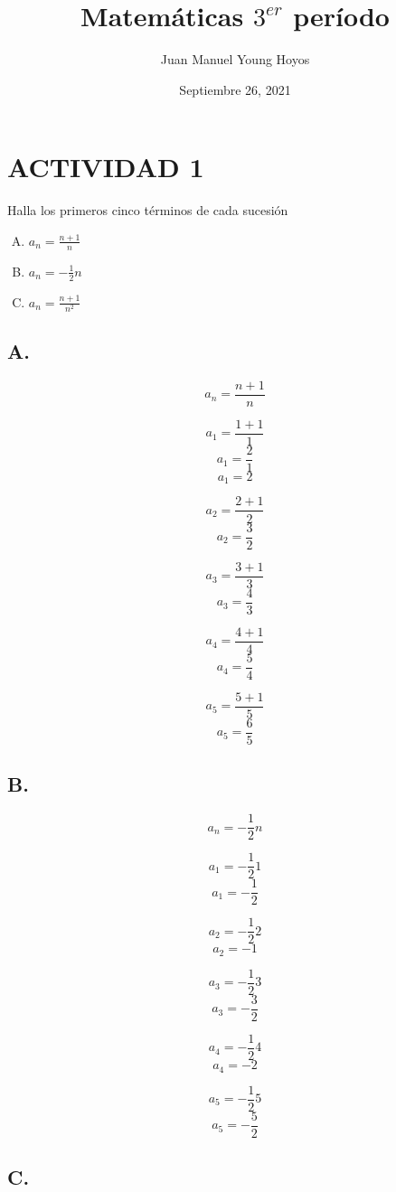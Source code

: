 \documentclass[12pt, letterpaper, twoside]{article}
\title{Matemáticas $3^{er}$ período}
\author{Juan Manuel Young Hoyos}
\date{Septiembre 26, 2021}
\begin{document}
\maketitle


\section*{ACTIVIDAD 1}

Halla los primeros cinco términos de cada sucesión

\begin{enumerate}[A.]
    \item $a_n = \frac{n + 1}{n}$
    \item $a_n = -\frac{1}{2}n $
    \item $a_n = \frac{n + 1}{n^2}$
\end{enumerate}

\subsection*{A.}

\[ a_n = \frac{n + 1}{n} \]

\[ a_1 = \frac{1 + 1}{1} \]
\[ a_1 = \frac{2}{1} \]
\[ a_1 = 2 \]


\[ a_2 = \frac{2 + 1}{2} \]
\[ a_2 = \frac{3}{2} \]

\[ a_3 = \frac{3 + 1}{3} \]
\[ a_3 = \frac{4}{3} \]

\[ a_4 = \frac{4 + 1}{4} \]
\[ a_4 = \frac{5}{4} \]

\[ a_5 = \frac{5 + 1}{5} \]
\[ a_5 = \frac{6}{5} \]

\subsection*{B.}

\[ a_n = -\frac{1}{2}n \]

\[ a_1 = -\frac{1}{2}1 \]
\[ a_1 = -\frac{1}{2} \]

\[ a_2 = -\frac{1}{2}2 \]
\[ a_2 = -1 \]

\[ a_3 = -\frac{1}{2}3 \]
\[ a_3 = -\frac{3}{2} \]

\[ a_4 = -\frac{1}{2}4 \]
\[ a_4 = -2 \]

\[ a_5 = -\frac{1}{2}5 \]
\[ a_5 = -\frac{5}{2} \]


\subsection*{C.}
\end{document}
